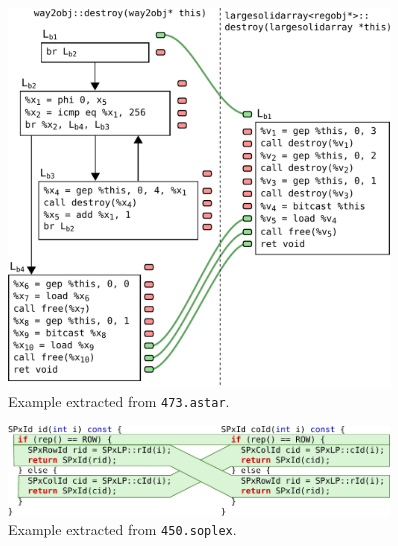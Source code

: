 \begin{figure}[h]
  \centering
  \includegraphics[width=0.9\textwidth]{src/fastfm/figs/astar-across-bb.pdf}
  \caption{Example extracted from \texttt{473.astar}.}
  \label{fig:astar-example}
\end{figure}


\begin{figure}[h]
  \centering
  \includegraphics[width=0.9\textwidth]{src/fastfm/figs/soplex-example.pdf}
  \caption{Example extracted from \texttt{450.soplex}.}
  \label{fig:soplex-example}
\end{figure}